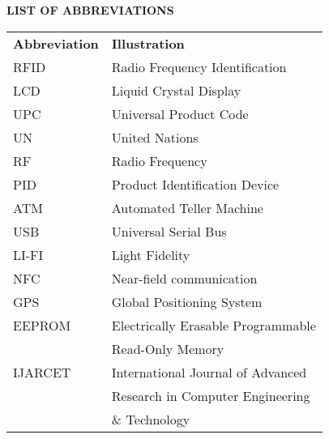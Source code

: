 \documentclass[12pt]{article}
\begin{document}
\newpage
{}
\begin{center}
\tableofcontents
\end{center}

\newpage
{}
\begin{center}
\large\textbf{LIST OF ABBREVIATIONS}
\end{center}
\begin{table}[h]
\centering
\begin{tabular}{l l}
\textbf{Abbreviation} & \textbf{Illustration} \\
RFID & Radio Frequency Identification \\
LCD & Liquid Crystal Display \\
UPC & Universal Product Code \\
UN & United Nations \\
RF & Radio Frequency \\
PID & Product Identification Device \\
ATM & Automated Teller Machine \\
USB & Universal Serial Bus \\
LI-FI & Light Fidelity \\
NFC & Near-field communication \\
GPS & Global Positioning System \\
EEPROM & Electrically Erasable Programmable \\
& Read-Only Memory \\
IJARCET & International Journal of Advanced \\
& Research in Computer Engineering \\
& \& Technology
\end{tabular}
\end{table}

\newpage
{}
\renewcommand*\listfigurename{LIST OF FIGURES} 
\begin{center}
\listoffigures
\end{center}

\newpage
{}
\renewcommand*\listtablename{LIST OF TABLES} 
\begin{center}
\listoftables
\end{center}
\end{document}
